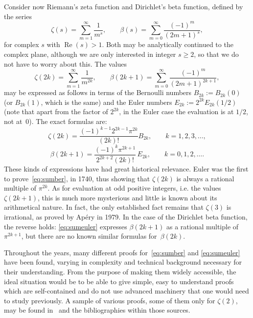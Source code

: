 \documentclass[11pt, oneside]{article}
\renewcommand{\Re}{\operatorname{Re}}
\theoremstyle{plain}
\theoremstyle{definition}
\begin{document}

Consider now Riemann's zeta function and Dirichlet's beta function, defined by the series
\begin{equation}
\label{eq:dosseries}
  \zeta(s) = \sum_{m=1}^\infty \frac{1}{m^s},
  \qquad
  \beta(s) = \sum_{m=0}^\infty \frac{(-1)^m}{(2m+1)^s},
\end{equation}
for complex $s$ with $\Re(s) > 1$. Both may be analytically continued to the complex plane, although we are only interested in integer $s \geq 2$, so that we do not have to worry about this. The values
\[
  \zeta(2k) = \sum_{m=1}^\infty \frac{1}{m^{2k}},
  \qquad
  \beta(2k+1) = \sum_{m=0}^\infty \frac{(-1)^m}{(2m+1)^{2k+1}},
\]
may be expressed as follows in terms of the Bernoulli numbers $B_{2k} := B_{2k}(0)$ (or $B_{2k}(1)$, which is the same) and the Euler numbers $E_{2k} := 2^{2k}E_{2k}(1/2)$ (note that apart from the factor of $2^{2k}$, in the Euler case the evaluation is at $1/2$, not at~$0$). The exact formulas are:
\begin{equation}
\label{eq:sumber}
  \zeta(2k) = \frac{(-1)^{k-1} 2^{2k-1} \pi^{2k}}{(2k)!} B_{2k},
  \qquad k=1,2,3,\dots,
\end{equation}
\begin{equation}
\label{eq:sumeuler}
  \beta(2k+1) = \frac{(-1)^{k} \pi^{2k+1}}{2^{2k+2} (2k)!} \,E_{2k},
  \qquad k=0,1,2,\dots.
\end{equation}
These kinds of expressions have had great historical relevance. Euler was the first to prove~\eqref{eq:sumber}, in 1740, thus showing that $\zeta(2k)$ is always a rational multiple of $\pi^{2k}$. As for evaluation at odd positive integers, i.e. the values $\zeta(2k+1)$, this is much more mysterious and little is known about its arithmetical nature. In fact, the only established fact remains that $\zeta(3)$ is irrational, as proved by Ap\'ery in 1979.
In the case of the Dirichlet beta function, the reverse holds: \eqref{eq:sumeuler} expresses $\beta(2k+1)$ as a rational multiple of $\pi^{2k+1}$, but there are no known similar formulas for~$\beta(2k)$.

Throughout the years, many different proofs for~\eqref{eq:sumber} and \eqref{eq:sumeuler} have been found, varying in complexity and technical background necessary for their understanding. From the purpose of making them widely accessible, the ideal situation would be to be able to give simple, easy to understand proofs which are self-contained and do not use advanced machinery that one would need to study previously. A sample of various proofs, some of them only for $\zeta(2)$, may be found in~\cite{AiZi-zeta, AD, AmoDF, Ber, Duo, DwMi, Gr, Mor, Ri} and the bibliographies within those sources.
\end{document}
